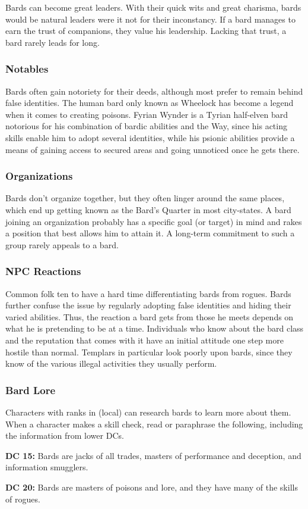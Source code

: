 Bards can become great leaders. With their quick wits and great charisma, bards would be natural leaders were it not for their inconstancy. If a bard manages to earn the trust of companions, they value his leadership. Lacking that trust, a bard rarely leads for long.

\subsubsection{Notables}
Bards often gain notoriety for their deeds, although most prefer to remain behind false identities. The human bard only known as Wheelock has become a legend when it comes to creating poisons. Fyrian Wynder is a Tyrian half-elven bard notorious for his combination of bardic abilities and the Way, since his acting skills enable him to adopt several identities, while his psionic abilities provide a means of gaining access to secured areas and going unnoticed once he gets there.

\subsubsection{Organizations}
Bards don't organize together, but they often linger around the same places, which end up getting known as the Bard's Quarter in most city-states. A bard joining an organization probably has a specific goal (or target) in mind and rakes a position that best allows him to attain it. A long-term commitment to such a group rarely appeals to a bard.

\subsubsection{NPC Reactions}
Common folk ten to have a hard time differentiating bards from rogues. Bards further confuse the issue by regularly adopting false identities and hiding their varied abilities. Thus, the reaction a bard gets from those he meets depends on what he is pretending to be at a time. Individuals who know about the bard class and the reputation that comes with it have an initial attitude one step more hostile than normal. Templars in particular look poorly upon bards, since they know of the various illegal activities they usually perform.

\subsubsection{Bard Lore}
Characters with ranks in  (local) can research bards to learn more about them. When a character makes a skill check, read or paraphrase the following, including the information from lower DCs.

\textbf{DC 15:} Bards are jacks of all trades, masters of performance and deception, and information smugglers.

\textbf{DC 20:} Bards are masters of poisons and lore, and they have many of the skills of rogues.